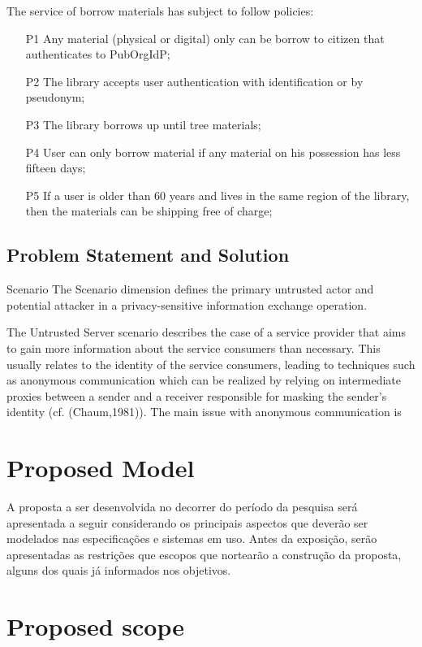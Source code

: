 \documentclass{doublecol-new}
\begin{document}
The service of borrow materials has subject to follow policies:
\begin{enumerate}
	\item [P1] Any material (physical or digital) only can be borrow to citizen that authenticates to PubOrgIdP;
	\item [P2] The library accepts user authentication with identification or by pseudonym;
	\item [P3] The library borrows up until tree materials;
	\item [P4] User can only borrow material if any material on his possession has less fifteen days;
	\item [P5] If a user is older than 60 years and lives in the same region of the library, then the materials can be shipping free of charge;	
\end{enumerate}



\subsection[sec:problemstatement]{Problem Statement and Solution}

Scenario The Scenario dimension defines the primary untrusted actor and potential attacker in a privacy-sensitive information exchange operation.

The Untrusted Server scenario describes the case of a service provider that aims to gain more information about the service
consumers than necessary. This usually relates to the identity of the service consumers, leading to techniques such as
anonymous communication which can be realized by relying on intermediate proxies between a sender and a receiver
responsible for masking the sender's identity (cf. (Chaum,1981)). The main issue with anonymous communication is



\section{Proposed Model}
A proposta a ser desenvolvida no decorrer do período da pesquisa será apresentada a seguir considerando os principais aspectos que deverão ser modelados nas especificações e sistemas em uso. Antes da exposição, serão apresentadas as restrições que escopos que nortearão a construção da proposta, alguns dos quais já informados nos objetivos.



\section{Proposed scope}
\end{document}
